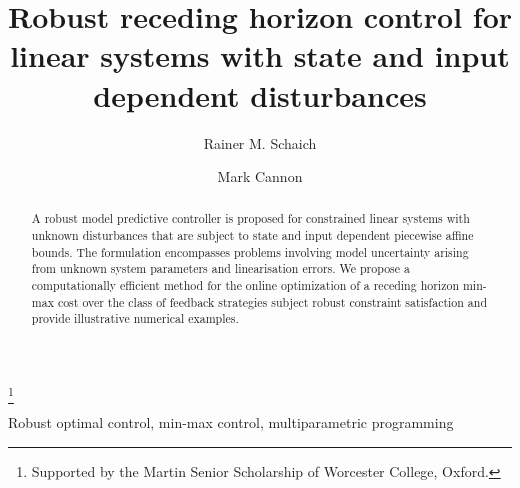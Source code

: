 \documentclass{ifacconf}
\begin{document}
\begin{frontmatter}


\title{Robust receding horizon control for linear systems with state and input dependent disturbances}


\thanks[footnoteinfo]{Supported by the Martin Senior Scholarship of Worcester College, Oxford.}

\author[Oxford]{Rainer M. Schaich} 
\author[Oxford]{Mark Cannon} 

\address[Oxford]{Department of Engineering Science, University of Oxford, OX1 3PJ, UK. (e-mail: 
rainer.schaich@eng.ox.ac.uk, mark.cannon@eng.ox.ac.uk).}

\begin{abstract}                %
  A robust model predictive controller is proposed for constrained linear systems with unknown disturbances
  that are subject to state and input dependent piecewise affine bounds.
  The formulation encompasses problems involving model uncertainty arising from unknown system
  parameters and linearisation errors. We propose a computationally efficient method for the online
  optimization of a receding horizon min-max cost over the class of feedback strategies subject robust
  constraint satisfaction and provide illustrative numerical examples.
\end{abstract}

\begin{keyword}
Robust optimal control, min-max control, multiparametric programming 
\end{keyword}

\end{frontmatter}
\end{document}
